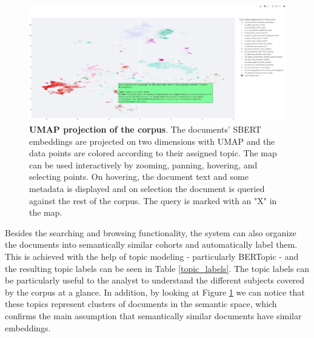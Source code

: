 \documentclass[a4paper]{article}
\begin{document}
\begin{figure}[H]
	\centering
	\includegraphics[scale=0.325]{./assets/map_screenshot}
	\caption{\textbf{UMAP projection of the corpus}. The documents' SBERT embeddings are projected on two dimensions with UMAP and the data points are colored according to their assigned topic. The map can be used interactively by zooming, panning, hovering, and selecting points. On hovering, the document text and some metadata is displayed and on selection the document is queried against the rest of the corpus. The query is marked with an "X" in the map.}
	\label{app_map}
\end{figure}

Besides the searching and browsing functionality, the system can also organize the documents into semantically similar cohorts and automatically label them. This is achieved with the help of topic modeling - particularly BERTopic - and the resulting topic labels can be seen in Table \ref{topic_labels}. The topic labels can be particularly useful to the analyst to understand the different subjects covered by the corpus at a glance. In addition, by looking at Figure \ref{app_map} we can notice that these topics represent clusters of documents in the semantic space, which confirms the main assumption that semantically similar documents have similar embeddings.
\end{document}
